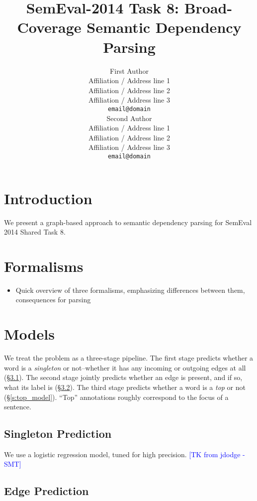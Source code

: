 \documentclass[11pt]{article}
\title{SemEval-2014 Task 8: Broad-Coverage Semantic Dependency Parsing}
\author{First Author \\
  Affiliation / Address line 1 \\
  Affiliation / Address line 2 \\
  Affiliation / Address line 3 \\
  {\tt email@domain} \\\And
  Second Author \\
  Affiliation / Address line 1 \\
  Affiliation / Address line 2 \\
  Affiliation / Address line 3 \\
  {\tt email@domain} \\}
\date{}
\newcommand{\sam}[1]{\textcolor{blue}{[#1 -SMT]}}
\begin{document}
\maketitle
\begin{abstract}
  
\end{abstract}



\section{Introduction}

We present a graph-based approach to semantic dependency parsing for SemEval
2014 Shared Task 8.

\section{Formalisms}

\begin{itemize}
\item Quick overview of three formalisms, emphasizing differences between them, consequences for parsing
\end{itemize}


\section{Models}

We treat the problem as a three-stage pipeline.
The first stage predicts whether a word is a \emph{singleton} or not--whether it
has any incoming or outgoing edges at all (\S\ref{s:singleton_model}).
The second stage jointly predicts whether an edge is present, and if so, what
its label is (\S\ref{s:edge_model}).
The third stage predicts whether a word is a \emph{top} or not
(\S\ref{s:top_model}).
``Top'' annotations roughly correspond to the focus of a
sentence.


\subsection{Singleton Prediction} \label{s:singleton_model}

We use a logistic regression model, tuned for high precision.
\sam{TK from jdodge}

\subsection{Edge Prediction} \label{s:edge_model}
\end{document}
